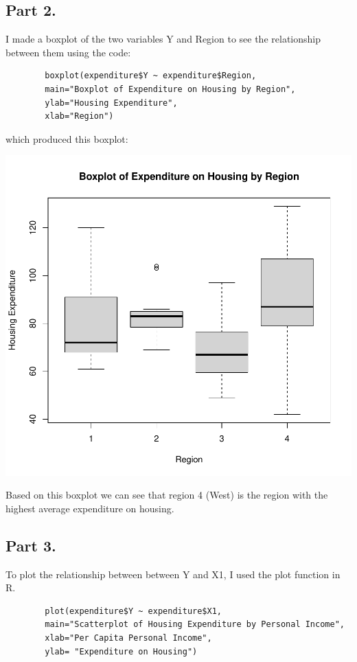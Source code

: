 \documentclass[12pt,letterpaper]{article}
\begin{document}
     \subsection*{Part 2.}
     I made a boxplot of the two variables Y and Region to see the relationship between them using the code:
     \begin{Verbatim}
     	boxplot(expenditure$Y ~ expenditure$Region, 
     	main="Boxplot of Expenditure on Housing by Region",
     	ylab="Housing Expenditure",
     	xlab="Region")
     \end{Verbatim}
     which produced this boxplot:
\begin{center}
\includegraphics{Boxplot_Q2.2}
\end{center}
     
     Based on this boxplot we can see that region 4 (West) is the region with the highest average expenditure on housing.
     
     \subsection*{Part 3.}
     
     To plot the relationship between between Y and X1, I used the plot function in R.
     \begin{verbatim}
     	plot(expenditure$Y ~ expenditure$X1,
     	main="Scatterplot of Housing Expenditure by Personal Income",
     	xlab="Per Capita Personal Income",
     	ylab= "Expenditure on Housing")
     \end{verbatim}
     
\end{document}
